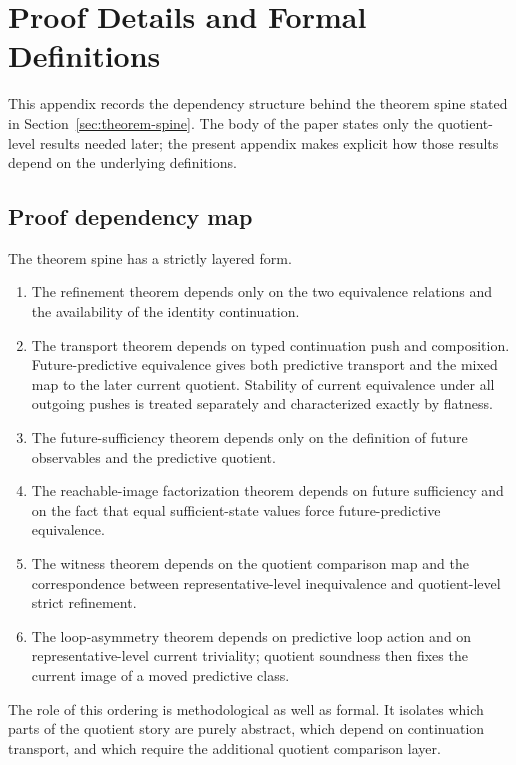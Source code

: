 \documentclass[11pt]{article}
\theoremstyle{definition}
\begin{document}
\appendix

\section{Proof Details and Formal Definitions}\label{app:proof-details}
This appendix records the dependency structure behind the theorem spine stated in Section~\ref{sec:theorem-spine}. The body of the paper states only the quotient-level results needed later; the present appendix makes explicit how those results depend on the underlying definitions.

\subsection{Proof dependency map}\label{appsubsec:proof-dependency-map}
The theorem spine has a strictly layered form.
\begin{enumerate}
\item The refinement theorem depends only on the two equivalence relations and the availability of the identity continuation.
\item The transport theorem depends on typed continuation push and composition. Future-predictive equivalence gives both predictive transport and the mixed map to the later current quotient. Stability of current equivalence under all outgoing pushes is treated separately and characterized exactly by flatness.
\item The future-sufficiency theorem depends only on the definition of future observables and the predictive quotient.
\item The reachable-image factorization theorem depends on future sufficiency and on the fact that equal sufficient-state values force future-predictive equivalence.
\item The witness theorem depends on the quotient comparison map and the correspondence between representative-level inequivalence and quotient-level strict refinement.
\item The loop-asymmetry theorem depends on predictive loop action and on representative-level current triviality; quotient soundness then fixes the current image of a moved predictive class.
\end{enumerate}

The role of this ordering is methodological as well as formal. It isolates which parts of the quotient story are purely abstract, which depend on continuation transport, and which require the additional quotient comparison layer.
\end{document}
